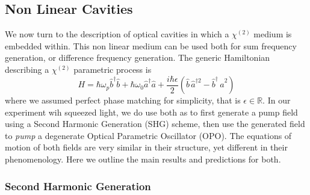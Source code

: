 \subsection{Non Linear Cavities}
We now turn to the description of optical cavities in which a $\chi^{(2)}$ medium is embedded within. This non linear medium can be used both for sum frequency generation, or difference frequency generation. The generic Hamiltonian describing a  $\chi^{(2)}$ parametric process is 
\begin{equation}
  H = \hbar \omega_p \hat{b}^{\dagger}\hat{b} + \hbar \omega_0 \hat{a}^\dagger \hat{a} + \frac{i\hbar\epsilon}{2}( \hat{b} \, \hat{a}^{\dagger2} - \hat{b}^\dagger \, \hat{a}^2)
\end{equation}
where we assumed perfect phase matching for simplicity, that is $\epsilon \in\mathbb{R}$. In our experiment wih squeezed light, we do use both as to first generate a pump field using a Second Harmonic Generation (SHG) scheme, then use the generated field to \textit{pump} a degenerate Optical Parametric Oscillator (OPO). The equations of motion of both fields are very similar in their structure, yet different in their phenomenology. Here we outline the main results and predictions for both. 
\subsubsection{Second Harmonic Generation}





